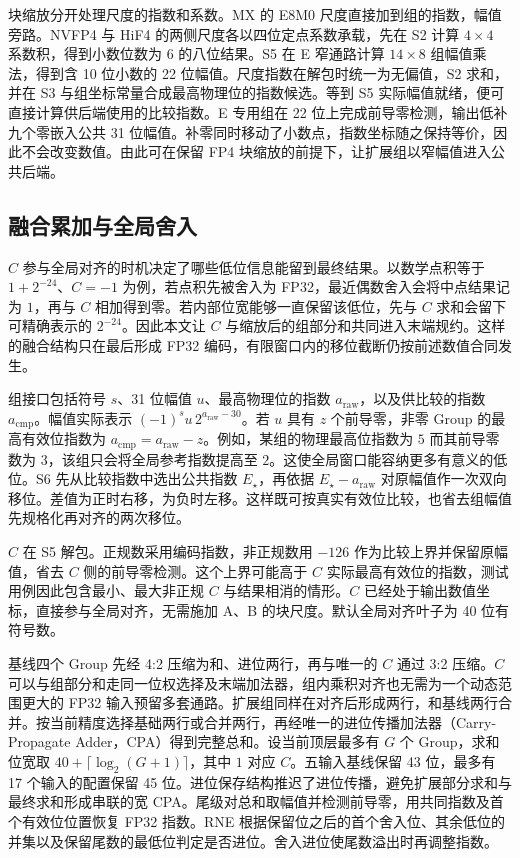 \documentclass[10.5pt,compsoc,UTF8]{CjC}
\begin{document}
块缩放分开处理尺度的指数和系数。MX 的 E8M0 尺度直接加到组的指数，幅值旁路。NVFP4 与 HiF4 的两侧尺度各以四位定点系数承载，先在 S2 计算 $4\times4$ 系数积，得到小数位数为 6 的八位结果。S5 在 E 窄通路计算 $14\times8$ 组幅值乘法，得到含 10 位小数的 22 位幅值。尺度指数在解包时统一为无偏值，S2 求和，并在 S3 与组坐标常量合成最高物理位的指数候选。等到 S5 实际幅值就绪，便可直接计算供后端使用的比较指数。E 专用组在 22 位上完成前导零检测，输出低补九个零嵌入公共 31 位幅值。补零同时移动了小数点，指数坐标随之保持等价，因此不会改变数值。由此可在保留 FP4 块缩放的前提下，让扩展组以窄幅值进入公共后端。

\subsection{融合累加与全局舍入}

$C$ 参与全局对齐的时机决定了哪些低位信息能留到最终结果。以数学点积等于 $1+2^{-24}$、$C=-1$ 为例，若点积先被舍入为 FP32，最近偶数舍入会将中点结果记为 $1$，再与 $C$ 相加得到零。若内部位宽能够一直保留该低位，先与 $C$ 求和会留下可精确表示的 $2^{-24}$。因此本文让 $C$ 与缩放后的组部分和共同进入末端规约。这样的融合结构只在最后形成 FP32 编码，有限窗口内的移位截断仍按前述数值合同发生。

组接口包括符号 $s$、31 位幅值 $u$、最高物理位的指数 $a_{\mathrm{raw}}$，以及供比较的指数 $a_{\mathrm{cmp}}$。幅值实际表示 $(-1)^s u\,2^{a_{\mathrm{raw}}-30}$。若 $u$ 具有 $z$ 个前导零，非零 Group 的最高有效位指数为 $a_{\mathrm{cmp}}=a_{\mathrm{raw}}-z$。例如，某组的物理最高位指数为 $5$ 而其前导零数为 $3$，该组只会将全局参考指数提高至 $2$。这使全局窗口能容纳更多有意义的低位。S6 先从比较指数中选出公共指数 $E_\star$，再依据 $E_\star-a_{\mathrm{raw}}$ 对原幅值作一次双向移位。差值为正时右移，为负时左移。这样既可按真实有效位比较，也省去组幅值先规格化再对齐的两次移位。

$C$ 在 S5 解包。正规数采用编码指数，非正规数用 $-126$ 作为比较上界并保留原幅值，省去 $C$ 侧的前导零检测。这个上界可能高于 $C$ 实际最高有效位的指数，测试用例因此包含最小、最大非正规 $C$ 与结果相消的情形。$C$ 已经处于输出数值坐标，直接参与全局对齐，无需施加 A、B 的块尺度。默认全局对齐叶子为 40 位有符号数。

基线四个 Group 先经 4:2 压缩为和、进位两行，再与唯一的 $C$ 通过 3:2 压缩。$C$ 可以与组部分和走同一位权选择及末端加法器，组内乘积对齐也无需为一个动态范围更大的 FP32 输入预留多套通路。扩展组同样在对齐后形成两行，和基线两行合并。按当前精度选择基础两行或合并两行，再经唯一的进位传播加法器（Carry-Propagate Adder，CPA）得到完整总和。设当前顶层最多有 $G$ 个 Group，求和位宽取 $40+\lceil\log_2(G+1)\rceil$，其中 $1$ 对应 $C$。五输入基线保留 43 位，最多有 17 个输入的配置保留 45 位。进位保存结构推迟了进位传播，避免扩展部分求和与最终求和形成串联的宽 CPA。尾级对总和取幅值并检测前导零，用共同指数及首个有效位位置恢复 FP32 指数。RNE 根据保留位之后的首个舍入位、其余低位的并集以及保留尾数的最低位判定是否进位。舍入进位使尾数溢出时再调整指数。
\end{document}
